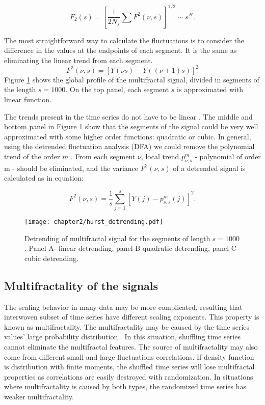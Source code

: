 \begin{equation}
F_2(s) = [\frac{1}{2N_s} \sum F^2(\nu,s)]^{1/2}  \sim s^H.
\end{equation} 


{The most straightforward way to calculate the fluctuations is to consider the difference in the values at the endpoints of each segment. It is the same as eliminating the linear trend from each segment.  
$$ F^2(\nu, s) = [Y(\nu s) - Y((\nu +1)s)]^2$$ 
Figure \ref{fig:hurst_detrending} shows the global profile of the multifractal signal, divided in segments of the length $s=1000$. On the top panel, each segment $s$ is approximated with linear function.
	}
	
 The trends present in the time series do not have to be linear \cite{hu2001effect}. The middle and bottom panel in Figure \ref{fig:hurst_detrending} show that the segments of the signal could be very well approximated with some higher order functions: quadratic or cubic. In general, using the detrended fluctuation analysis (DFA) we could remove the polynomial trend of the order $m$ \cite{kantelhardt2001detecting}. From each segment $\nu$, local trend $p^m_{\nu, s}$ - polynomial of order m - should be eliminated, and the variance $F^2(\nu, s)$ of a detrended signal is calculated as in equation:
	
	\begin{equation}
	F^2(\nu, s) = \frac{1}{s}\sum_{j=1}^s \left[Y(j) - p^m_{\nu, s}(j)\right]^2.
	\label{eq:var}
	\end{equation}

\begin{figure}[h]
	\centering
	\texttt{[image: chapter2/hurst\_detrending.pdf]}
	\caption[Detrending multifractal signal.]{Detrending of multifractal signal for the segments of length $s=1000$. Panel A- linear detrending, panel B-quadratic detrending, panel C- cubic detrending. }
	\label{fig:hurst_detrending}
\end{figure}

\newpage
\clearpage

\subsection{Multifractality of the signals}

The scaling behavior in many data may be more complicated, resulting that interwoven subset of time series have different scaling exponents. This property is known as multifractality.  The multifractality may be caused by the time series values' large probability distribution \cite{kantelhardt2002, ihlen2012}. In this situation, shuffling time series cannot eliminate the multifractal features. The source of multifractality may also come from different small and large fluctuations correlations. If density function is distribution with finite moments, the shuffled time series will lose multifractal properties as correlations are easily destroyed with randomization. In situations where multifractality is caused by both types, the randomized time series has weaker multifractality. 
 
